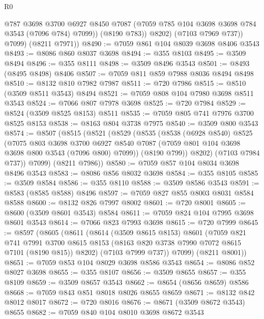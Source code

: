 \begin{lexlean}{R0}
\begin{coremodule}
                @787
                @3698
                @3700
                @6927
                @8450
                @7087
                (@7059 @785 @104 @3698 @3698 @784 @3543 (@7096 @784) @7099))
              (@8190 @783))
            @8202)
          (@7103 @7969 @737))
        @7099)
      (@8211 @7971))
@8490 := @7059 @861 @104 @8039 @3698 @8406 @3543
@8493 := @8086 @860 @8037 @3698
@8494 := @355 @8103
@8495 := @3509 @8494
@8496 := @355 @8111
@8498 := @3509 @8496 @3543
@8501 := @8493 (@8495 @8498) @8406
@8507 := @7059 @811 @859 @7988 @8036 @8494 @8498
@8510 := @8132 @810 @7982 @7987
@8511 := @720 @7986
@8515 := @8510 (@3509 @8511 @3543) @8494
@8521 := @7059 @808 @104 @7980 @3698 @8511 @3543
@8524 := @7066 @807 @7978 @3698
@8525 := @720 @7984
@8529 := @8524 (@3509 @8525 @8153) @8511
@8535 := @7059 @805 @741 @7976 @3700 @8525 @8153
@8538 := @8163 @804 @3738 @7975
@8540 := @3509 @800 @3543
@8574 := @8507
    (@8515
      (@8521
        (@8529
          (@8535
            (@8538
              (@6928 @8540)
              @8525
              (@7075
                @803
                @3698
                @3700
                @6927
                @8540
                @7087
                (@7059 @801 @104 @3698 @3698 @800 @3543 (@7096 @800) @7099))
              (@8190 @799))
            @8202)
          (@7103 @7984 @737))
        @7099)
      (@8211 @7986))
@8580 := @7059 @857 @104 @8034 @3698 @8496 @3543
@8583 := @8086 @856 @8032 @3698
@8584 := @355 @8105
@8585 := @3509 @8584
@8586 := @355 @8110
@8588 := @3509 @8586 @3543
@8591 := @8583 (@8585 @8588) @8496
@8597 := @7059 @827 @855 @8003 @8031 @8584 @8588
@8600 := @8132 @826 @7997 @8002
@8601 := @720 @8001
@8605 := @8600 (@3509 @8601 @3543) @8584
@8611 := @7059 @824 @104 @7995 @3698 @8601 @3543
@8614 := @7066 @823 @7993 @3698
@8615 := @720 @7999
@8645 := @8597
    (@8605
      (@8611
        (@8614
          (@3509 @8615 @8153)
          @8601
          (@7059
            @821
            @741
            @7991
            @3700
            @8615
            @8153
            (@8163 @820 @3738 @7990 @7072 @8615 @7101 (@8190 @815))
            @8202)
          (@7103 @7999 @737))
        @7099)
      (@8211 @8001))
@8651 := @7059 @853 @104 @8029 @3698 @8586 @3543
@8654 := @8086 @852 @8027 @3698
@8655 := @355 @8107
@8656 := @3509 @8655
@8657 := @355 @8109
@8659 := @3509 @8657 @3543
@8662 := @8654 (@8656 @8659) @8586
@8668 := @7059 @843 @851 @8018 @8026 @8655 @8659
@8671 := @8132 @842 @8012 @8017
@8672 := @720 @8016
@8676 := @8671 (@3509 @8672 @3543) @8655
@8682 := @7059 @840 @104 @8010 @3698 @8672 @3543

\end{coremodule}
\end{lexlean}
